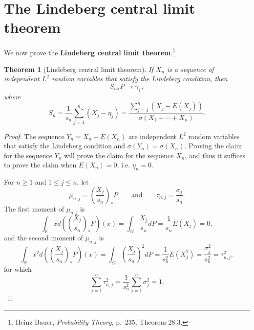\documentclass{article}
\newtheorem{theorem}{Theorem}
\theoremstyle{definition}
\begin{document}
\section{The Lindeberg central limit theorem}
We now prove the \textbf{Lindeberg central limit theorem}.\footnote{Heinz Bauer,
{\em Probability Theory}, p.~235, Theorem 28.3.}

\begin{theorem}[Lindeberg central limit theorem]
If $X_n$ is a sequence of independent 
 $L^2$ random variables that satisfy the Lindeberg condition, 
then 
\[
{S_n}_*P \to \gamma_1,
\]
where 
\[
S_n = \frac{1}{s_n} \sum_{j=1}^n (X_j-\eta_j) = \frac{\sum_{j=1}^n (X_j-E(X_j))}{\sigma(X_1+\cdots+X_n)}.
\]
\end{theorem}
\begin{proof}
The sequence $Y_n=X_n-E(X_n)$ are independent $L^2$ random variables that satisfy the Lindeberg condition and
$\sigma(Y_n)=\sigma(X_n)$. Proving the claim for the sequence $Y_n$ will prove the claim for the sequence
$X_n$, and thus  it suffices to prove the claim when $E(X_n)=0$, i.e. $\eta_n=0$. 

For $n \geq 1$ and $1 \leq j \leq n$, let
\[
\mu_{n,j} = \left(\frac{X_j}{s_n} \right)_*P \qquad \textrm{and} \qquad \tau_{n,j} = \frac{\sigma_j}{s_n}.
\]
The first moment of $\mu_{n,j}$ is
\[
\int_{\mathbb{R}} x d\left( \left(\frac{X_j}{s_n}\right)_*P\right)(x)
=\int_{\Omega} \frac{X_j}{s_n} dP
=\frac{1}{s_n} E(X_j) = 0,
\]
and the second moment of $\mu_{n,j}$ is
\[
\int_{\mathbb{R}} x^2 d\left( \left(\frac{X_j}{s_n} \right)_*P\right)(x)
=\int_{\Omega} \left(\frac{X_j}{s_n}\right)^2 dP
=\frac{1}{s_n^2} E(X_j^2)
=\frac{\sigma_j^2}{s_n^2}
=\tau_{n,j}^2,
\]
for which
\[
\sum_{j=1}^n \tau_{n,j}^2 = \frac{1}{s_n^2} \sum_{j=1}^n \sigma_j^2 = 1.
\]



\end{proof}
\end{document}
